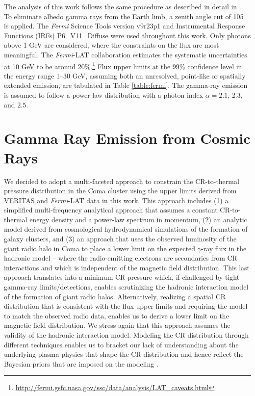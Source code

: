 \documentclass[12pt,manuscript]{aastex}
\def\Fermi{{\em Fermi}\xspace}
\begin{document}
The analysis of this work follows the same procedure as described in detail in
\citet{article:Abdo_etal:2009}. To eliminate albedo gamma rays from the Earth limb, a zenith angle
cut of 105$^{\circ}$ is applied. The \Fermi Science Tools version v9r23p1 and Instrumental
Response Functions (IRFs) P6\_V11\_Diffuse were used throughout this work. Only photons above 1 GeV
are considered, where the constraints on the flux are most meaningful. The \Fermi-LAT collaboration
estimates the systematic uncertainties at 10 GeV to be around
20\%.\footnote{\url{http://fermi.gsfc.nasa.gov/ssc/data/analysis/LAT\_caveats.html}} Flux upper
limits at the 99\% confidence level in the energy range 1--30 GeV, assuming both an unresolved,
point-like or spatially extended emission, are tabulated in Table \ref{table:fermi}. The gamma-ray
emission is assumed to follow a power-law distribution with a photon index $\alpha=2.1$, 2.3, and
$2.5$.

%
%

\section{Gamma Ray Emission from Cosmic Rays}
We decided to adopt a multi-faceted approach to constrain the CR-to-thermal pressure distribution in
the Coma cluster using the upper limits derived from VERITAS and \Fermi-LAT data in this work. This
approach includes (1) a simplified multi-frequency analytical approach that assumes a constant
CR-to-thermal energy density and a power-law spectrum in momentum, (2) an analytic model derived
from cosmological hydrodynamical simulations of the formation of galaxy clusters, and (3) an
approach that uses the observed luminosity of the giant radio halo in Coma to place a lower limit on
the expected $\gamma$-ray flux in the hadronic model -- where the radio-emitting electrons are
secondaries from CR interactions and which is independent of the magnetic field distribution.  This
last approach translates into a minimum CR pressure which, if challenged by tight gamma-ray
limits/detections, enables scrutinizing the hadronic interaction model of the formation of giant
radio halos. Alternatively, realizing a spatial CR distribution that is consistent with the flux
upper limits and requiring the model to match the observed radio data, enables us to derive a
lower limit on the magnetic field distribution. We stress again that this approach assumes the
validity of the hadronic interaction model. Modeling the CR distribution through different
techniques enables us to bracket our lack of understanding about the underlying plasma physics that
shape the CR distribution and hence reflect the Bayesian priors that are imposed on the modeling
\citep[see][for a discussion]{article:PinzkePfrommerBergstrom}.
\end{document}
